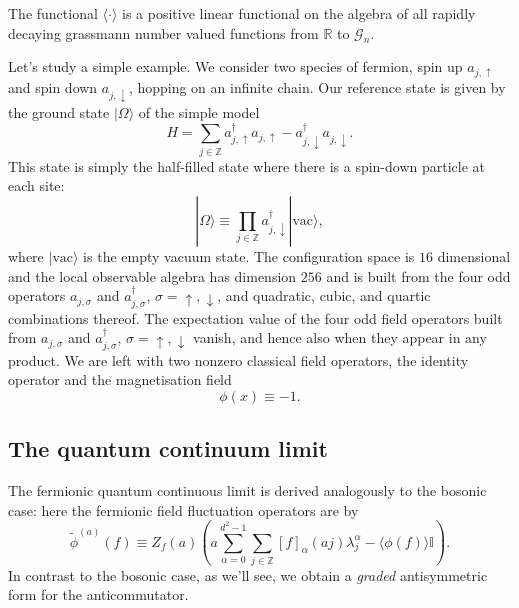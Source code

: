 \documentclass[prl,twocolumn,lengthcheck,superscriptaddress]{revtex4-1}
\theoremstyle{definition}
\theoremstyle{remark}
\begin{document}
The functional $\langle \cdot \rangle$ is a positive linear functional on the algebra of all rapidly decaying grassmann number valued functions from $\mathbb{R}$ to $\mathcal{G}_n$.

Let's study a simple example. We consider two species of fermion, spin up $a_{j,\uparrow}$ and spin down $a_{j,\downarrow}$, hopping on an infinite chain. Our reference state is given by the ground state $|\Omega\rangle$ of the simple model 
\begin{equation}
	H = \sum_{j\in\mathbb{Z}} a_{j,\uparrow}^\dag a_{j,\uparrow} - a_{j,\downarrow}^\dag a_{j,\downarrow}.
\end{equation}
This state is simply the half-filled state where there is a spin-down particle at each site:
\begin{equation}
	|\Omega\rangle \equiv \prod_{j\in\mathbb{Z}} a_{j,\downarrow}^\dag|\text{vac}\rangle,
\end{equation}
where $|\text{vac}\rangle$ is the empty vacuum state. The configuration space is $16$ dimensional and the local observable algebra has dimension $256$ and is built from the four odd operators $a_{j,\sigma}$ and $a_{j,\sigma}^\dag$, $\sigma = \uparrow, \downarrow$, and quadratic, cubic, and quartic combinations thereof.  The expectation value of the four odd field operators built from $a_{j,\sigma}$ and $a_{j,\sigma}^\dag$, $\sigma = \uparrow, \downarrow$ vanish, and hence also when they appear in any product. We are left with two nonzero classical field operators, the identity operator and the magnetisation field
\begin{equation}
	\phi(x) \equiv -1.
\end{equation}

\subsection{The quantum continuum limit}
The fermionic quantum continuous limit is derived analogously to the bosonic case: here the fermionic field fluctuation operators are by
\begin{equation}
	\widetilde{\phi}^{(a)}(f) \equiv Z_f(a)\left( a\sum_{\alpha=0}^{d^2-1}\sum_{j\in \mathbb{Z}} [f]_\alpha(aj) \lambda^\alpha_j - \langle\phi(f)\rangle\mathbb{I}\right).
\end{equation}
In contrast to the bosonic case, as we'll see, we obtain a \emph{graded} antisymmetric form for the anticommutator. 
\end{document}
